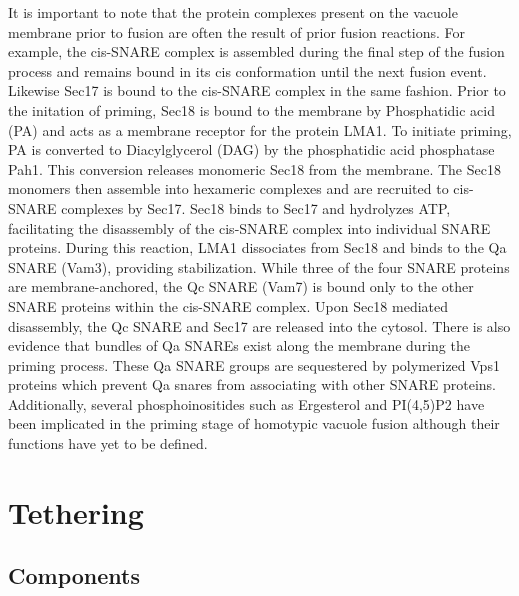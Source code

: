 \documentclass[12pt,twoside]{reedthesis}
\begin{document}
It is important to note that the protein complexes present on the vacuole membrane prior to fusion are often the result of prior fusion reactions. For example, the cis-SNARE complex is assembled during the final step of the fusion process and remains bound in its cis conformation until the next fusion event. Likewise Sec17 is bound to the cis-SNARE complex in the same fashion. Prior to the initation of priming, Sec18 is bound to the membrane by Phosphatidic acid (PA) and acts as a membrane receptor for the protein LMA1. To initiate priming, PA is converted to Diacylglycerol (DAG) by the phosphatidic acid phosphatase Pah1. This conversion releases monomeric Sec18 from the membrane. The Sec18 monomers then assemble into hexameric complexes and are recruited to cis-SNARE complexes by Sec17. Sec18 binds to Sec17 and hydrolyzes ATP, facilitating the disassembly of the cis-SNARE complex into individual SNARE proteins. During this reaction, LMA1 dissociates from Sec18 and binds to the Qa SNARE (Vam3), providing stabilization. While three of the four SNARE proteins are membrane-anchored, the Qc SNARE (Vam7) is bound only to the other SNARE proteins within the cis-SNARE complex. Upon Sec18 mediated disassembly, the Qc SNARE and Sec17 are released into the cytosol. There is also evidence that bundles of Qa SNAREs exist along the membrane during the priming process. These Qa SNARE groups are sequestered by polymerized Vps1 proteins which prevent Qa snares from associating with other SNARE proteins. Additionally, several phosphoinositides such as Ergesterol and PI(4,5)P2 have been implicated in the priming stage of homotypic vacuole fusion although their functions have yet to be defined.

\section{Tethering}\label{tethering}

\subsection{Components}\label{components-1}
\end{document}
